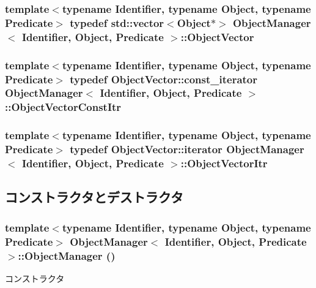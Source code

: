 \subsubsection[{ObjectVector}]{\setlength{\rightskip}{0pt plus 5cm}template$<$typename Identifier, typename Object, typename Predicate$>$ typedef std::vector$<$Object$\ast$$>$ {\bf ObjectManager}$<$ Identifier, Object, Predicate $>$::{\bf ObjectVector}}\label{classObjectManager_aa4fcbaee3d2516a6334f08fff837c7be}
\subsubsection[{ObjectVectorConstItr}]{\setlength{\rightskip}{0pt plus 5cm}template$<$typename Identifier, typename Object, typename Predicate$>$ typedef ObjectVector::const\_\-iterator {\bf ObjectManager}$<$ Identifier, Object, Predicate $>$::{\bf ObjectVectorConstItr}}\label{classObjectManager_acff0ec2b138b2dc0a2ad6b80c7dc1482}
\subsubsection[{ObjectVectorItr}]{\setlength{\rightskip}{0pt plus 5cm}template$<$typename Identifier, typename Object, typename Predicate$>$ typedef ObjectVector::iterator {\bf ObjectManager}$<$ Identifier, Object, Predicate $>$::{\bf ObjectVectorItr}}\label{classObjectManager_a64d7341e2e8152cd114ab2fbd66a237e}


\subsection{コンストラクタとデストラクタ}
\subsubsection[{ObjectManager}]{\setlength{\rightskip}{0pt plus 5cm}template$<$typename Identifier, typename Object, typename Predicate$>$ {\bf ObjectManager}$<$ Identifier, Object, Predicate $>$::{\bf ObjectManager} ()\hspace{0.3cm}{\ttfamily  [inline]}}\label{classObjectManager_af32caa02e21da2fba152097615c00e60}
コンストラクタ 

